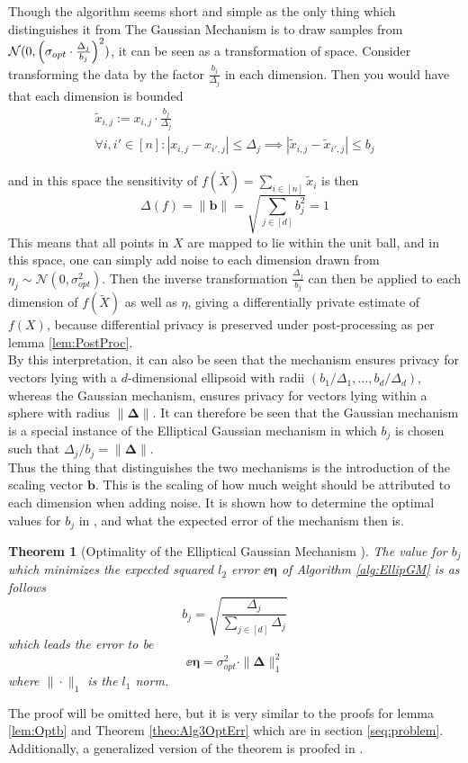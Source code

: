 \documentclass[a4paper,12pt]{article}
\newtheorem{theorem}{Theorem}
\begin{document}
Though the algorithm seems short and simple as the only thing which distinguishes it from The Gaussian Mechanism 
is to draw samples from $\mathcal{N}(0, \left (\sigma_{opt} \cdot \frac{\Delta_j}{b_j}\right)^2)$, 
it can be seen as a transformation of space. Consider transforming the data by the factor $\frac{b_j}{\Delta_j}$ in each dimension. 
Then you would have that each dimension is bounded
\begin{gather*}
    \tilde{x}_{i,j} := x_{i,j} \cdot \frac{b_j}{\Delta_j} \\
    \forall i,i' \in [n] : |x_{i,j} - x_{i',j}| \le \Delta_j \implies |\tilde{x}_{i,j} - \tilde{x}_{i',j}| \le b_j
\end{gather*}

and in this space the sensitivity of $f(\tilde{X})= \sum_{i \in [n]} \tilde{x}_i$ is then
\[
    \Delta(f) = \|\bm{b}\| = \sqrt{\sum_{j \in [d]} b_j^2} =  1
\]
This means that all points in $X$ are mapped to lie within the unit ball, and in this space, one can simply add noise to each 
dimension drawn from $\eta_j \sim \mathcal{N}(0, \sigma_{opt}^2)$. Then the inverse transformation $\frac{\Delta_j}{b_j}$ 
can then be applied to each dimension of $f(\tilde{X})$ as well as $\eta$, giving a differentially private estimate of $f(X)$, 
because differential privacy is preserved under post-processing as per lemma \ref{lem:PostProc}. \\


By this interpretation, it can also be seen that the mechanism ensures privacy for vectors lying with a $d$-dimensional
ellipsoid with radii $(b_1/\Delta_1, \dots, b_d/\Delta_d)$, 
whereas the Gaussian mechanism, ensures privacy for vectors lying within a sphere with radius $\| \bm{\Delta} \|$.
It can therefore be seen that the Gaussian mechanism is a special instance of the Elliptical Gaussian mechanism
in which $b_j$ is chosen such that $\Delta_j/b_j = \| \bm{\Delta} \|$. \\
Thus the thing that distinguishes the two mechanisms is the introduction of the scaling vector $\bm{b}$.
This is the scaling of how much weight should be attributed to each dimension when adding noise. It is shown how to determine the optimal values for $b_j$
in \cite{Lebeda2022}, and what the expected error of the mechanism then is.

\begin{theorem}[Optimality of the Elliptical Gaussian Mechanism ]
The value for $b_j$ which minimizes the expected squared $l_2$ error $\ee{\bm{\eta}}$ of Algorithm \ref{alg:EllipGM} is as follows
\[
    b_j = \sqrt{\frac{\Delta_j}{\sum_{j \in [d]} \Delta_j}}
\]
which leads the error to be
\begin{equation}
\label{eq:EGMErr}
    \ee{\bm{\eta}} =  \sigma_{opt}^2 \cdot \| \bm{\Delta} \|_1^2
\end{equation}
where $\| \cdot \|_1$ is the $l_1$ norm.

\end{theorem}
The proof will be omitted here, but it is very similar to the proofs for lemma \ref{lem:Optb} and Theorem \ref{theo:Alg3OptErr} which are in section \ref{seq:problem}.
Additionally, a generalized version of the theorem is proofed in \cite{Lebeda2022}.
\end{document}
